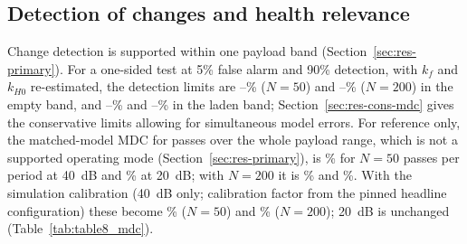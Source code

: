 \subsection{Detection of changes and health relevance}\label{sec:res-relative}
Change detection is supported within one payload band (Section~\ref{sec:res-primary}). For a one-sided
test at 5\% false alarm and 90\% detection, with $k_f$ and $k_{H0}$ re-estimated, the detection limits are
\BandEmptyMDCFiftyMin--\BandEmptyMDCFiftyMax\% ($N=50$) and
\BandEmptyMDCTwoHundredMin--\BandEmptyMDCTwoHundredMax\% ($N=200$) in the empty band, and
\BandLadenMDCFiftyMin--\BandLadenMDCFiftyMax\% and \BandLadenMDCTwoHundredMin--\BandLadenMDCTwoHundredMax\%
in the laden band; Section~\ref{sec:res-cons-mdc} gives the conservative limits allowing for simultaneous
model errors. For reference only, the matched-model MDC for passes over the whole payload range, which is
not a supported operating mode (Section~\ref{sec:res-primary}), is \MDCFiftyForty\% for $N=50$ passes per
period at 40~dB and \MDCFiftyTwenty\% at 20~dB; with $N=200$ it is \MDCTwoHundredForty\% and
\MDCTwoHundredTwenty\%. With the simulation calibration (40~dB only; calibration factor from the pinned
headline configuration) these become \MDCCalFiftyForty\% ($N=50$) and \MDCCalTwoHundredForty\% ($N=200$);
20~dB is unchanged (Table~\ref{tab:table8_mdc}).



